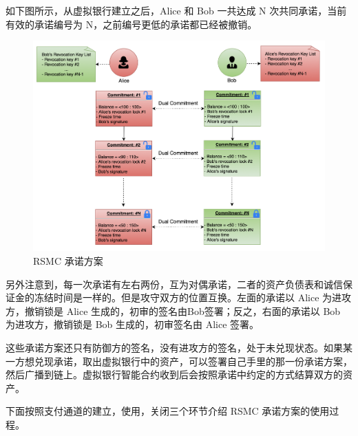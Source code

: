 如下图所示，从虚拟银行建立之后，Alice 和 Bob 一共达成 N 次共同承诺，当前有效的承诺编号为 N，之前编号更低的承诺都已经被撤销。

\begin{figure}[h!]
    \centering
    \includegraphics[width=12cm, keepaspectratio]{../images/dual_rsmc_3.png}
    \caption{RSMC 承诺方案}
    \label{fig:rsmc_3}
\end{figure}

另外注意到，每一次承诺有左右两份，互为对偶承诺，二者的资产负债表和诚信保证金的冻结时间是一样的。但是攻守双方的位置互换。左面的承诺以 Alice 为进攻方，撤销锁是 Alice 生成的，初审的签名由Bob签署；反之，右面的承诺以 Bob 为进攻方，撤销锁是 Bob 生成的，初审签名由 Alice 签署。

这些承诺方案还只有防御方的签名，没有进攻方的签名，处于未兑现状态。如果某一方想兑现承诺，取出虚拟银行中的资产，可以签署自己手里的那一份承诺方案，然后广播到链上。虚拟银行智能合约收到后会按照承诺中约定的方式结算双方的资产。

下面按照支付通道的建立，使用，关闭三个环节介绍 RSMC 承诺方案的使用过程。

